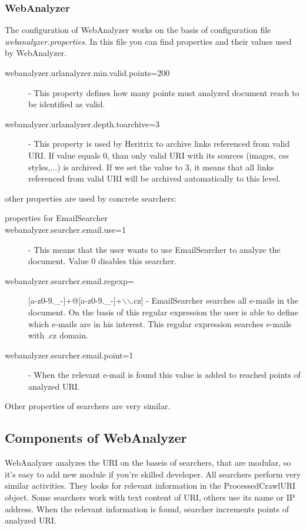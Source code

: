 \documentclass[11pt,a4paper]{article}
\begin{document}
\subsubsection{WebAnalyzer}
The configuration of WebAnalyzer works on the basis of configuration file \emph{webanalyzer.properties}. In this file you can find properties and their values used by WebAnalyzer.

\begin{description}
\item[webanalyzer.urlanalyzer.min.valid.points=200] - This property defines how many points must analyzed document reach to be identified as valid.
\item[webanalyzer.urlanalyzer.depth.toarchive=3] - This property is used by Heritrix to archive links referenced from valid URI. If value equals 0, than only valid URI with its sources (images, css styles,...) is archived. If we set the value to 3, it means that all links referenced from valid URI will be archived automatically to this level.
\end{description} 

other properties are used by concrete searchers:
\begin{description}
\item[properties for EmailSearcher]
\item[webanalyzer.searcher.email.use=1] - This means that the user wants to use EmailSearcher to analyze the document. Value 0 disables this searcher.
\item[webanalyzer.searcher.email.regexp=][a-z0-9.\_-]+@[a-z0-9.\_-]+$\backslash$$\backslash$.cz] - EmailSearcher searches all e-mails in the document. On the basis of this regular expression the user is able to define which e-mails are in his interest. This regular expression searches e-mails with .cz domain.
\item[webanalyzer.searcher.email.point=1] - When the relevant e-mail is found this value is added to reached points of analyzed URI.
\end{description}

Other properties of searchers are very similar.

\subsection{Components of WebAnalyzer}
WebAnalyzer analyzes the URI on the baseis of searchers, that are modular, so it's easy to add new module if you're skilled developer. All searchers perform very similar activities. They looks for relevant information in the ProcessedCrawlURI object. Some searchers work with text content of URI, others use its name or IP address. When the relevant information is found, searcher increments points of analyzed URI.
\end{document}
